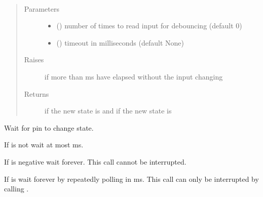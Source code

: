 \documentclass[letterpaper,10pt,english]{sphinxmanual}
\begin{document}
\begin{fulllineitems}
\begin{fulllineitems}
\end{fulllineitems}


\begin{fulllineitems}
\label{\detokenize{index:rcpy.gpio.Input.low}}~\begin{quote}\begin{description}
\item[{Parameters}] \leavevmode\begin{itemize}
\item {} 
 () \textendash{} number of times to read input for debouncing (default 0)

\item {} 
 () \textendash{} timeout in milliseconds (default None)

\end{itemize}

\item[{Raises}] \leavevmode
{\hyperref[\detokenize{index:rcpy.gpio.InputTimeout}]{}} \textendash{} if more than  ms have elapsed without the input changing

\item[{Returns}] \leavevmode
{} if the new state is {\hyperref[\detokenize{index:rcpy.gpio.LOW}]{}} and  if the new state is {\hyperref[\detokenize{index:rcpy.gpio.HIGH}]{}}

\end{description}\end{quote}

Wait for pin to change state.

If  is not  wait at most  ms.

If  is negative wait forever. This call cannot be interrupted.

If  is  wait forever by repeatedly polling in {\hyperref[\detokenize{index:rcpy.gpio.POLL_TIMEOUT}]{}} ms. This call can only be interrupted by calling {\hyperref[\detokenize{index:rcpy.exit}]{}}.

\end{fulllineitems}


\end{fulllineitems}
\end{document}
